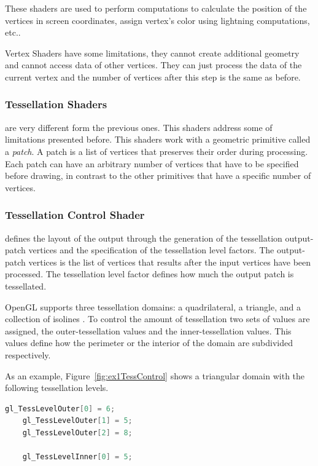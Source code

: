 These shaders are used to perform computations to calculate the position of the vertices in screen coordinates, assign vertex's color using lightning computations, etc..

Vertex Shaders have some limitations, they cannot create additional geometry and cannot access data of other vertices. They can just process the data of the current vertex and the number of vertices after this step is the same as before.


\subsubsection{Tessellation Shaders} %
\label{sub:tesselation_shaders}
are very different form the previous ones. This shaders address some of limitations presented before.
This shaders work with a geometric primitive called a \emph{patch}. A patch is a list of vertices that preserves their order during processing. Each patch can have an arbitrary number of vertices that have to be specified before drawing, in contrast to the other primitives that have a specific number of vertices.

\subsubsection{Tessellation Control Shader} %
\label{ssub:tesselation_control_shader}
	 defines the layout of the output through the generation of the tessellation output-patch vertices and the specification of the tessellation level factors. The output-patch vertices is the list of vertices that results after the input vertices have been processed. The tessellation level factor defines how much the output patch is tessellated. 

	OpenGL supports three tessellation domains: a quadrilateral, a triangle, and a collection of isolines \cite{shreiner2013opengl}. To control the amount of tessellation two sets of values are assigned, the outer-tessellation values and the inner-tessellation values. This values define how the perimeter or the interior of the domain are subdivided respectively. 

	As an example, Figure~\ref{fig:ex1TessControl} shows a triangular domain with the following tessellation levels. 
	\begin{lstlisting}[frame=single,language=C]
	gl_TessLevelOuter[0] = 6;
	gl_TessLevelOuter[1] = 5;
	gl_TessLevelOuter[2] = 8;

	gl_TessLevelInner[0] = 5;
	\end{lstlisting}

